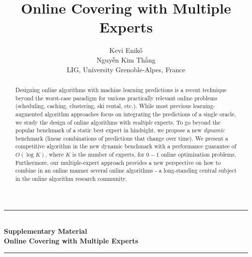 \documentclass{article}
\title{Online Covering with Multiple Experts}
\author{%
  Kevi Enik\H{o}\\
  Nguyễn Kim Thắng\\
  LIG, University Grenoble-Alpes, France\\
}
\begin{document}
\maketitle


\begin{abstract}
    Designing online algorithms with machine learning predictions is a recent technique beyond the worst-case paradigm for various practically relevant online problems (scheduling, caching, clustering, ski rental, etc.). While most previous learning-augmented algorithm approaches focus on integrating the predictions of a single oracle,
    we study the design of online algorithms with \emph{multiple} experts. To go beyond the popular benchmark of a static best expert in hindsight, we propose a new \emph{dynamic} benchmark (linear combinations of predictions that change over time).
    We present a competitive algorithm in the new dynamic benchmark with a performance guarantee of $O(\log K)$, where $K$ is the number of experts,
    for $0-1$ online optimization problems. Furthermore, our multiple-expert approach provides a new perspective on how to combine in an online manner several online algorithms - a long-standing central subject in the online algorithm research community.
\end{abstract}









\newpage
%
\begin{center}
\rule{\textwidth}{.5pt} \\[3pt]
\textbf{\large Supplementary Material} \\[7pt]
\textbf{\large Online Covering with Multiple Experts}
\rule{\textwidth}{.5pt}
\end{center}

%
\appendix
%



\end{document}
